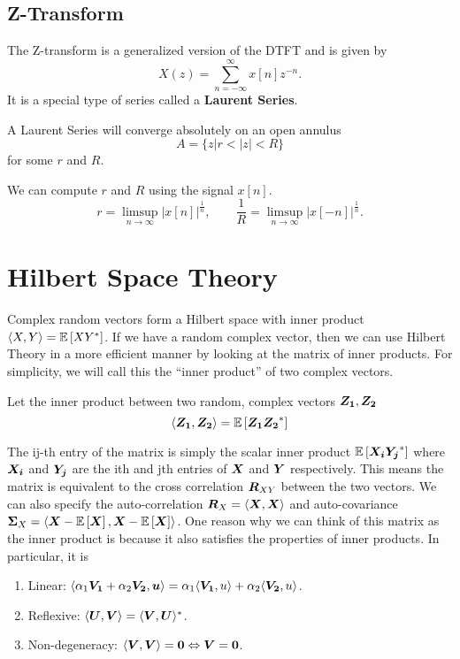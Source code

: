 \subsection{Z-Transform}
The Z-transform is a generalized version of the DTFT and is given by \[
	X(z) = \sum_{n=-\infty}^{\infty}x[n]z^{-n}.
\]
It is a special type of series called a \textbf{Laurent Series}.
\begin{theorem}
	A Laurent Series will converge absolutely on an open annulus \[
		A = \{z | r < |z| < R \}
	\] for some $r$ and $R$.
	\label{thm:z-transform-roc}
\end{theorem}
We can compute $r$ and $R$ using the signal $x[n]$.
\[
	r = \limsup_{n\to\infty} |x[n]|^{\frac{1}{n}}, \qquad \frac{1}{R} = \limsup_{n\to\infty}|x[-n]|^{\frac{1}{n}}.
\]
\section{Hilbert Space Theory}
Complex random vectors form a Hilbert space with inner product $\langle X, Y \rangle = \mathbb{E}\left[XY^*\right]$.
If we have a random complex vector, then we can use Hilbert Theory in a more efficient manner by looking at the matrix of inner products.
For simplicity, we will call this the ``inner product'' of two complex vectors.
\begin{definition}
	Let the inner product between two random, complex vectors $\boldsymbol{Z_1}, \boldsymbol{Z_2}$ \[
		\langle \boldsymbol{Z_1}, \boldsymbol{Z_2} \rangle = \mathbb{E}\left[\boldsymbol{Z_1}\boldsymbol{Z_2}^*\right]
	\]
	\label{defn:inner-product}
\end{definition}
The ij-th entry of the matrix is simply the scalar inner product $\mathbb{E}\left[\boldsymbol{X_i}\boldsymbol{Y_j}^*\right]$ where $\boldsymbol{X_i}$ and $\boldsymbol{Y_j}$ are the ith and jth entries of $\boldsymbol{X}$ and $\boldsymbol{Y}$ respectively.
This means the matrix is equivalent to the cross correlation $\boldsymbol{R}_{XY}$ between the two vectors.
We can also specify the auto-correlation $\boldsymbol{R}_X = \langle \boldsymbol{X}, \boldsymbol{X} \rangle$ and auto-covariance $\boldsymbol{\Sigma}_X = \langle \boldsymbol{X} - \mathbb{E}\left[\boldsymbol{X}\right], \boldsymbol{X} - \mathbb{E}\left[\boldsymbol{X}\right] \rangle$.
One reason why we can think of this matrix as the inner product is because it also satisfies the properties of inner products.
In particular, it is
\begin{enumerate}
	\item Linear: $\langle \alpha_1\boldsymbol{V_1}+\alpha_2\boldsymbol{V_2}, \boldsymbol{u} \rangle = \alpha_1\langle \boldsymbol{V_1}, u \rangle + \alpha_2\langle \boldsymbol{V_2}, u \rangle$.
	\item Reflexive: $\langle \boldsymbol{U}, \boldsymbol{V} \rangle = \langle \boldsymbol{V}, \boldsymbol{U} \rangle^*$.
	\item Non-degeneracy: $\langle \boldsymbol{V}, \boldsymbol{V} \rangle = \boldsymbol{0} \Leftrightarrow \boldsymbol{V} = \boldsymbol{0}$.
\end{enumerate}
